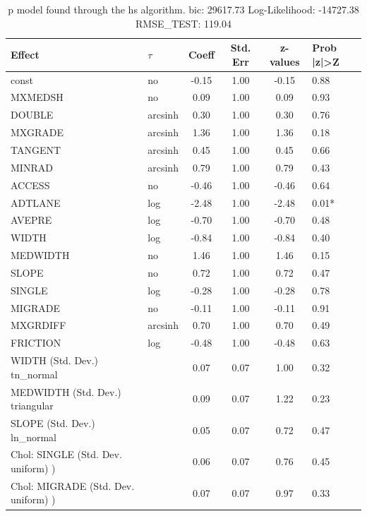\begin{table}
	\caption{p model found through the hs algorithm. bic: 29617.73 Log-Likelihood: -14727.38 RMSE_TEST: 119.04}
	\begin{center}
		\begin{tabular}{|l|l|c|c|c|l|}
			\hline
			Effect & $\tau$ & Coeff & Std. Err & z-values & Prob |z|>Z \\
			\hline
			const & no & -0.15 & 1.00 & -0.15 & 0.88 \\
			\hline
			MXMEDSH & no & 0.09 & 1.00 & 0.09 & 0.93 \\
			\hline
			DOUBLE & arcsinh & 0.30 & 1.00 & 0.30 & 0.76 \\
			\hline
			MXGRADE & arcsinh & 1.36 & 1.00 & 1.36 & 0.18 \\
			\hline
			TANGENT & arcsinh & 0.45 & 1.00 & 0.45 & 0.66 \\
			\hline
			MINRAD & arcsinh & 0.79 & 1.00 & 0.79 & 0.43 \\
			\hline
			ACCESS & no & -0.46 & 1.00 & -0.46 & 0.64 \\
			\hline
			ADTLANE & log & -2.48 & 1.00 & -2.48 & 0.01* \\
			\hline
			AVEPRE & log & -0.70 & 1.00 & -0.70 & 0.48 \\
			\hline
			WIDTH & log & -0.84 & 1.00 & -0.84 & 0.40 \\
			\hline
			MEDWIDTH & no & 1.46 & 1.00 & 1.46 & 0.15 \\
			\hline
			SLOPE & no & 0.72 & 1.00 & 0.72 & 0.47 \\
			\hline
			SINGLE & log & -0.28 & 1.00 & -0.28 & 0.78 \\
			\hline
			MIGRADE & no & -0.11 & 1.00 & -0.11 & 0.91 \\
			\hline
			MXGRDIFF & arcsinh & 0.70 & 1.00 & 0.70 & 0.49 \\
			\hline
			FRICTION & log & -0.48 & 1.00 & -0.48 & 0.63 \\
			\hline
			WIDTH (Std. Dev.) tn_normal &  & 0.07 & 0.07 & 1.00 & 0.32 \\
			\hline
			MEDWIDTH (Std. Dev.) triangular &  & 0.09 & 0.07 & 1.22 & 0.23 \\
			\hline
			SLOPE (Std. Dev.) ln_normal &  & 0.05 & 0.07 & 0.72 & 0.47 \\
			\hline
			 Chol: SINGLE (Std. Dev. uniform) ) &  & 0.06 & 0.07 & 0.76 & 0.45 \\
			\hline
			 Chol: MIGRADE (Std. Dev. uniform) ) &  & 0.07 & 0.07 & 0.97 & 0.33 \\
			\hline

\end{tabular}
\end{center}
\end{table}
